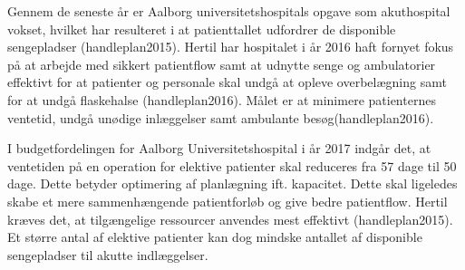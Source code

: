 
\noindent
Gennem de seneste år er Aalborg universitetshospitals opgave som akuthospital vokset, hvilket har resulteret i at patienttallet udfordrer de disponible sengepladser (handleplan2015). Hertil har hospitalet i år 2016 haft fornyet fokus på at arbejde med sikkert patientflow samt at udnytte senge og ambulatorier effektivt for at patienter og personale skal undgå at opleve overbelægning samt for at undgå flaskehalse (handleplan2016). Målet er at minimere patienternes ventetid, undgå unødige inlæggelser samt ambulante besøg(handleplan2016). 

\noindent
I budgetfordelingen for Aalborg Universitetshospital i år 2017 indgår det, at ventetiden på en operation for elektive patienter skal reduceres fra 57 dage til 50 dage. \cite{Budget2016} Dette betyder optimering af planlægning ift. kapacitet. Dette skal ligeledes skabe et mere sammenhængende patientforløb og give bedre patientflow. Hertil kræves det, at tilgængelige ressourcer anvendes mest effektivt (handleplan2015). Et større antal af elektive patienter kan dog mindske antallet af disponible sengepladser til akutte indlæggelser. 







